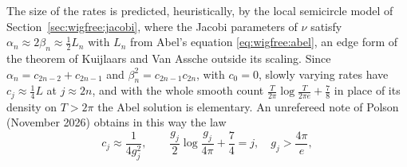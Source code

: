 The size of the rates is predicted, heuristically, by the local semicircle model of Section~\ref{sec:wigfree:jacobi}, where the Jacobi parameters of $\nu$ satisfy $\alpha_n\approx2\beta_n\approx\frac12L_n$ with $L_n$ from Abel's equation \eqref{eq:wigfree:abel}, an edge form of the theorem of Kuijlaars and Van Assche \cite{KVA99} outside its scaling. Since $\alpha_n=c_{2n-2}+c_{2n-1}$ and $\beta_n^2=c_{2n-1}c_{2n}$, with $c_0=0$, slowly varying rates have $c_j\approx\frac14L$ at $j\approx2n$, and with the whole smooth count $\frac T{2\pi}\log\frac T{2\pi e}+\frac78$ in place of its density on $T>2\pi$ the Abel solution is elementary. An unrefereed note of Polson (November 2026) obtains in this way the law
\begin{equation}\label{eq:ch21:ratelaw}
c_j\approx\frac1{4g_j^2},\qquad\frac{g_j}2\log\frac{g_j}{4\pi}+\frac74=j,\quad g_j>\frac{4\pi}e,
\end{equation}
